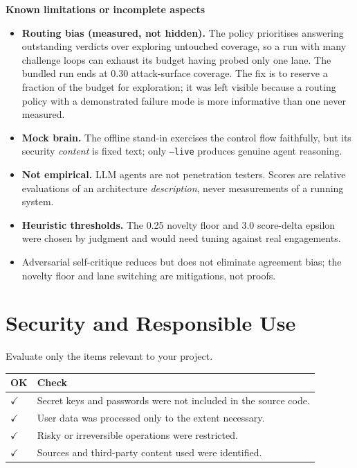 \documentclass[11pt,a4paper]{article}
\newcommand{\sectionintro}[1]{\textcolor{courseGray}{\small #1}\par\vspace{2pt}}
\newcommand{\qa}[2]{\textbf{#1}\par\vspace{-2pt}\begin{answerbox}#2\end{answerbox}}
\newcommand{\yes}{$\checkmark$}
\begin{document}
\qa{Known limitations or incomplete aspects}{%
\begin{itemize}[nosep]
  \item \textbf{Routing bias (measured, not hidden).} The policy prioritises answering
        outstanding verdicts over exploring untouched coverage, so a run with many
        challenge loops can exhaust its budget having probed only one lane. The bundled
        run ends at 0.30 attack-surface coverage. The fix is to reserve a fraction of the
        budget for exploration; it was left visible because a routing policy with a
        demonstrated failure mode is more informative than one never measured.
  \item \textbf{Mock brain.} The offline stand-in exercises the control flow faithfully,
        but its security \emph{content} is fixed text; only \texttt{--live} produces
        genuine agent reasoning.
  \item \textbf{Not empirical.} LLM agents are not penetration testers. Scores are
        relative evaluations of an architecture \emph{description}, never measurements of
        a running system.
  \item \textbf{Heuristic thresholds.} The 0.25 novelty floor and 3.0 score-delta epsilon
        were chosen by judgment and would need tuning against real engagements.
  \item Adversarial self-critique reduces but does not eliminate agreement bias; the
        novelty floor and lane switching are mitigations, not proofs.
\end{itemize}}

\section{Security and Responsible Use}
\sectionintro{Evaluate only the items relevant to your project.}

\begin{tabularx}{\linewidth}{@{}C{1.0cm}Y@{}}
\toprule
\textbf{OK} & \textbf{Check} \\
\midrule
\yes & Secret keys and passwords were not included in the source code. \\
\yes & User data was processed only to the extent necessary. \\
\yes & Risky or irreversible operations were restricted. \\
\yes & Sources and third-party content used were identified. \\
\bottomrule
\end{tabularx}
\end{document}
